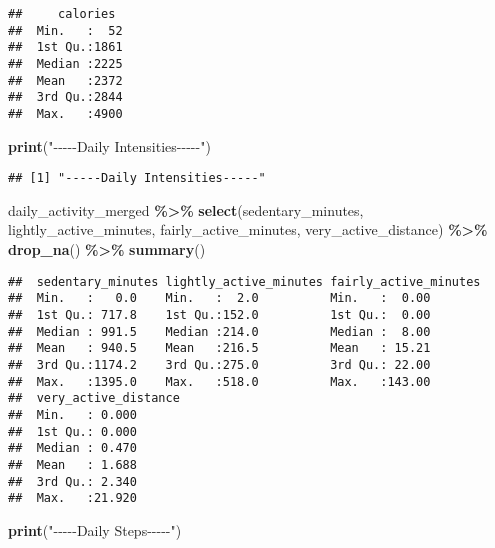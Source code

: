 \documentclass[
]{article}
\newenvironment{Shaded}{\begin{snugshade}}{\end{snugshade}}
\newcommand{\FunctionTok}[1]{\textcolor[rgb]{0.13,0.29,0.53}{\textbf{#1}}}
\newcommand{\NormalTok}[1]{#1}
\newcommand{\SpecialCharTok}[1]{\textcolor[rgb]{0.81,0.36,0.00}{\textbf{#1}}}
\newcommand{\StringTok}[1]{\textcolor[rgb]{0.31,0.60,0.02}{#1}}
\begin{document}
\begin{verbatim}
##     calories   
##  Min.   :  52  
##  1st Qu.:1861  
##  Median :2225  
##  Mean   :2372  
##  3rd Qu.:2844  
##  Max.   :4900
\end{verbatim}

\begin{Shaded}
\begin{Highlighting}[]
\FunctionTok{print}\NormalTok{(}\StringTok{"{-}{-}{-}{-}{-}Daily Intensities{-}{-}{-}{-}{-}"}\NormalTok{)}
\end{Highlighting}
\end{Shaded}

\begin{verbatim}
## [1] "-----Daily Intensities-----"
\end{verbatim}

\begin{Shaded}
\begin{Highlighting}[]
\NormalTok{daily\_activity\_merged }\SpecialCharTok{\%\textgreater{}\%} 
  \FunctionTok{select}\NormalTok{(sedentary\_minutes, lightly\_active\_minutes, fairly\_active\_minutes, very\_active\_distance) }\SpecialCharTok{\%\textgreater{}\%} 
  \FunctionTok{drop\_na}\NormalTok{() }\SpecialCharTok{\%\textgreater{}\%} 
  \FunctionTok{summary}\NormalTok{()}
\end{Highlighting}
\end{Shaded}

\begin{verbatim}
##  sedentary_minutes lightly_active_minutes fairly_active_minutes
##  Min.   :   0.0    Min.   :  2.0          Min.   :  0.00       
##  1st Qu.: 717.8    1st Qu.:152.0          1st Qu.:  0.00       
##  Median : 991.5    Median :214.0          Median :  8.00       
##  Mean   : 940.5    Mean   :216.5          Mean   : 15.21       
##  3rd Qu.:1174.2    3rd Qu.:275.0          3rd Qu.: 22.00       
##  Max.   :1395.0    Max.   :518.0          Max.   :143.00       
##  very_active_distance
##  Min.   : 0.000      
##  1st Qu.: 0.000      
##  Median : 0.470      
##  Mean   : 1.688      
##  3rd Qu.: 2.340      
##  Max.   :21.920
\end{verbatim}

\begin{Shaded}
\begin{Highlighting}[]
\FunctionTok{print}\NormalTok{(}\StringTok{"{-}{-}{-}{-}{-}Daily Steps{-}{-}{-}{-}{-}"}\NormalTok{)}
\end{Highlighting}
\end{Shaded}
\end{document}
